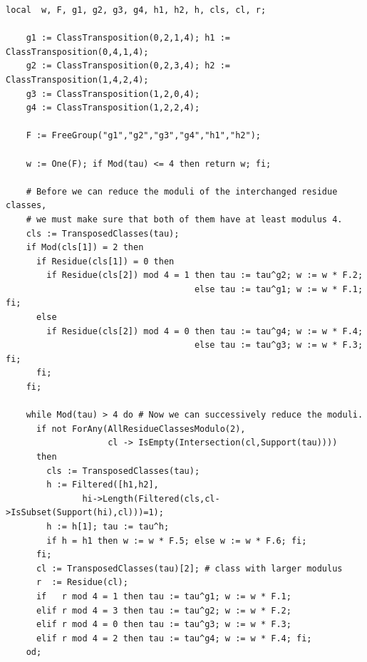 \documentclass[a4paper,11pt]{report}
\begin{document}
{{\begin{Verbatim}[commandchars=!@|,fontsize=\small,frame=single,label=GAP code]
    local  w, F, g1, g2, g3, g4, h1, h2, h, cls, cl, r;
  
    g1 := ClassTransposition(0,2,1,4); h1 := ClassTransposition(0,4,1,4);
    g2 := ClassTransposition(0,2,3,4); h2 := ClassTransposition(1,4,2,4);
    g3 := ClassTransposition(1,2,0,4);
    g4 := ClassTransposition(1,2,2,4);
  
    F := FreeGroup("g1","g2","g3","g4","h1","h2");
  
    w := One(F); if Mod(tau) <= 4 then return w; fi;
  
    # Before we can reduce the moduli of the interchanged residue classes,
    # we must make sure that both of them have at least modulus 4.
    cls := TransposedClasses(tau);
    if Mod(cls[1]) = 2 then
      if Residue(cls[1]) = 0 then
        if Residue(cls[2]) mod 4 = 1 then tau := tau^g2; w := w * F.2;
                                     else tau := tau^g1; w := w * F.1; fi;
      else
        if Residue(cls[2]) mod 4 = 0 then tau := tau^g4; w := w * F.4;
                                     else tau := tau^g3; w := w * F.3; fi;
      fi;
    fi;
  
    while Mod(tau) > 4 do # Now we can successively reduce the moduli.
      if not ForAny(AllResidueClassesModulo(2),
                    cl -> IsEmpty(Intersection(cl,Support(tau))))
      then
        cls := TransposedClasses(tau);
        h := Filtered([h1,h2],
               hi->Length(Filtered(cls,cl->IsSubset(Support(hi),cl)))=1);
        h := h[1]; tau := tau^h;
        if h = h1 then w := w * F.5; else w := w * F.6; fi;
      fi;
      cl := TransposedClasses(tau)[2]; # class with larger modulus
      r  := Residue(cl);
      if   r mod 4 = 1 then tau := tau^g1; w := w * F.1;
      elif r mod 4 = 3 then tau := tau^g2; w := w * F.2;
      elif r mod 4 = 0 then tau := tau^g3; w := w * F.3;
      elif r mod 4 = 2 then tau := tau^g4; w := w * F.4; fi;
    od;
  

\end{Verbatim}}}
\end{document}
